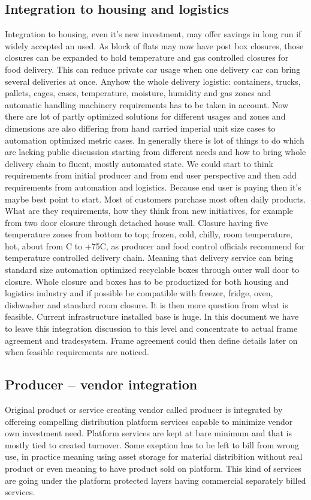 \subsection{Integration to housing and logistics}\label{integration}
Integration to housing, even it's new investment, may offer savings in long
run if widely accepted an used. As block of flats may now have post box
closures, those closures can be expanded to hold temperature and gas
controlled closures for food delivery. This can reduce private car usage when
one delivery car can bring several deliveries at once. Anyhow the whole
delivery logistic: containers, trucks, pallets, cages, cases, temperature,
moisture, humidity and gas  zones and automatic handling machinery
requirements has to be taken in account. Now there are lot of partly optimized
solutions for different usages and zones and dimensions are also differing
from hand carried imperial unit size cases to automation optimized metric
cases. In generally there is lot of things to do which are lacking public
discussion starting from different needs and how to bring whole delivery chain
to fluent, mostly automated state. We could start to think requirements from
initial producer and from end user perspective and then add requirements from
automation and logistics. Because end user is paying then it's maybe best
point to start. Most of customers purchase most often daily products. What are
they requirements, how they think  from new initiatives, for example from two
door closure through detached house wall. Closure having five temperature
zones from bottom to top; frozen, cold, chilly, room temperature, hot, about
from \textdegree C to +75\textdegree C, as producer and food
control officials recommend for temperature controlled delivery chain.
Meaning that delivery service can bring standard size automation optimized
recyclable boxes through outer wall door to closure. Whole closure and boxes
has to be productized for both housing and logistics industry and if possible
be compatible with freezer, fridge, oven, dishwasher and standard room
closure. It is then more question from what is feasible. Current
infrastructure installed base is huge. In this document we have to leave this
integration discussion to this level and concentrate to actual frame
agreement and tradesystem. Frame agreement could then define details later on
when feasible requirements are noticed. 

\subsection{Producer -- vendor integration}\label{producer}
Original product or service creating vendor called producer is integrated by
offereing compelling distribution platform services capable to minimize vendor
own investment need. Platform services are kept at bare minimum and that is
mostly tied to created turnover. Some exeption has to be left to bill from
wrong use, in practice meaning using asset storage for material distribition
without real product or even meaning to have product sold on platform. This
kind of services are going under the platform protected layers having
commercial separately billed services.

